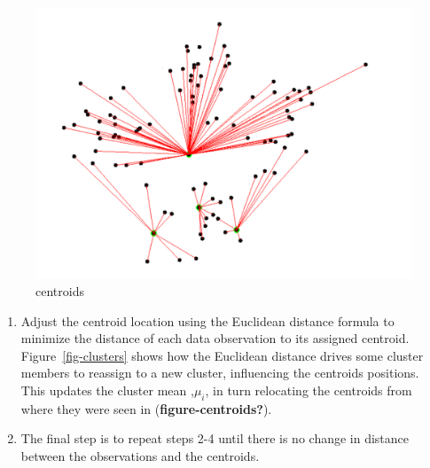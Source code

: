 \documentclass[
  letterpaper,
  DIV=11,
  numbers=noendperiod]{scrreprt}
\begin{document}
\begin{figure}

{\centering \includegraphics{./centroids.png}

}

\caption{\label{fig-centroids}centroids}

\end{figure}

\begin{enumerate}
\def\labelenumi{\arabic{enumi}.}
\setcounter{enumi}{3}
\item
  Adjust the centroid location using the Euclidean distance formula to
  minimize the distance of each data observation to its assigned
  centroid. Figure~\ref{fig-clusters} shows how the Euclidean distance
  drives some cluster members to reassign to a new cluster, influencing
  the centroids positions. This updates the cluster mean ,\(\mu_i\), in
  turn relocating the centroids from where they were seen in
  (\textbf{figure-centroids?}).
\item
  The final step is to repeat steps 2-4 until there is no change in
  distance between the observations and the centroids.
\end{enumerate}
\end{document}
